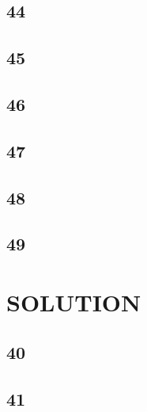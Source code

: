 \documentclass[12pt,a4paper]{article}
\begin{document}
\subsection{44}
\begin{CJK}{UTF8}{gbsn}
	
\end{CJK}
\subsection{45}
\begin{CJK}{UTF8}{gbsn}
	
\end{CJK}
\subsection{46}
\begin{CJK}{UTF8}{gbsn}
	
\end{CJK}
\subsection{47}
\begin{CJK}{UTF8}{gbsn}
	
\end{CJK}
\subsection{48}
\begin{CJK}{UTF8}{gbsn}
	
\end{CJK}
\subsection{49}

\section{SOLUTION}
\subsection{40}
\subsection{41}
\end{document}
